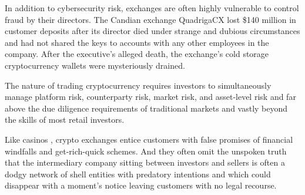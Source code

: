 In addition to cybersecurity risk, exchanges are often highly vulnerable to
control fraud by their directors. The Candian exchange QuadrigaCX lost \$140
million in customer deposits after its director died under strange and dubious
circumstances and had not shared the keys to accounts with any other employees
in the company. After the executive's alleged death, the exchange's cold storage
cryptocurrency wallets were mysteriously drained.


The nature of trading cryptocurrency requires investors to simultaneously manage
platform risk, counterparty risk, market risk, and asset-level risk and far
above the due diligence requirements of traditional markets and vastly beyond
the skills of most retail investors. \cite{roubini_great_2019}

Like casinos \cite{diehl_internets_2021}, crypto exchanges entice customers with
false promises of financial windfalls and get-rich-quick schemes. And they often
omit the unspoken truth that the intermediary company sitting between investors
and sellers is often a dodgy network of shell entities with predatory intentions
and which could disappear with a moment's notice leaving customers with no legal
recourse. \cite{doctorow_when_nodate}
